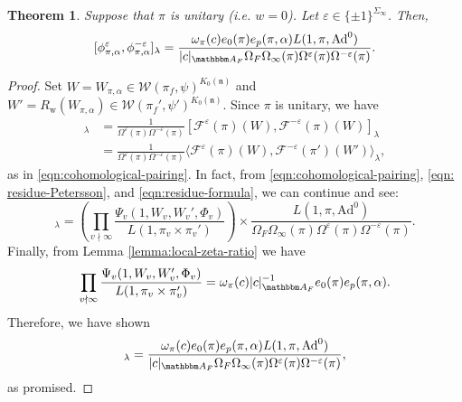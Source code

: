 \documentclass[10pt, twoside]{amsart}
\theoremstyle{plain}
\newtheorem{theorem}{Theorem}
\theoremstyle{definition}
\theoremstyle{remark}
\numberwithin{equation}{subsection}
\def\A{\mathbbm A}
\def\Ad{\mathrm{Ad}}
\def\gn{\mathfrak n}
\def\calw{\mathcal W}
\def\calf{\mathcal F}
\begin{document}
\begin{theorem}\label{thm:adjointLvalues}
Suppose that $\pi$ is unitary (i.e. $w = 0$). Let $\varepsilon \in \{\pm 1\}^{\Sigma_\infty}$. Then,
\begin{equation}\label{eq-adjoint}
[ \phi^{\varepsilon}_{\pi, \alpha}, \phi^{-\varepsilon}_{\pi, \alpha} ]_\lambda =  \frac{\omega_{\pi}(c)e_0(\pi)e_p(\pi,\alpha)L(1,\pi,\mathrm{Ad}^0)}{|c|_{\A_F}\Omega_F \Omega_\infty(\pi) \Omega^{\varepsilon}(\pi)\Omega^{-\varepsilon}(\pi)}.
\end{equation}
\end{theorem}
\begin{proof}
Set $W = W_{\pi,\alpha} \in \calw(\pi_f,\psi)^{K_0(\gn)}$ and $W' = R_{{ \boldsymbol{\mathrm{w}}}}(W_{\pi,\alpha}) \in \calw(\pi_f',\psi')^{K_0(\gn)}$. Since $\pi$ is unitary, we have
\begin{align*}
[\phi_{\pi,\alpha}^{\varepsilon}, \phi_{\pi,\alpha}^{-\varepsilon}]_{\lambda} &= \frac{1}{\Omega^{\varepsilon}(\pi)\Omega^{-\varepsilon}(\pi)}[\calf^{\varepsilon}(\pi)(W),\calf^{-\varepsilon}(\pi)(W)]_{\lambda}\\
&= \frac{1}{\Omega^{\varepsilon}(\pi)\Omega^{-\varepsilon}(\pi)} \langle \calf^{\varepsilon}(\pi)(W),\calf^{-\varepsilon}(\pi')(W')\rangle_{\lambda},
\end{align*}
as in \eqref{eqn:cohomological-pairing}. In fact, from \eqref{eqn:cohomological-pairing}, \eqref{eqn: residue-Petersson}, and \eqref{eqn:residue-formula}, we can continue and see:
\begin{equation*}
[ \phi^{\varepsilon}_{\pi, \alpha}, \phi^{-\varepsilon}_{\pi, \alpha} ]_\lambda = \left(\prod_{v \nmid \infty} \frac{\Psi_v(1,W_v,W_v',\Phi_v)}{L(1,\pi_v\times \pi_v')}\right) \times \frac{L(1,\pi,\Ad^0)}{\Omega_F \Omega_{\infty}(\pi) \Omega^{\varepsilon}(\pi) \Omega^{-\varepsilon}(\pi)}.
\end{equation*}
Finally, from Lemma \ref{lemma:local-zeta-ratio} we have
\begin{equation*}
\prod_{v \nmid \infty} \frac{\Psi_v(1,W_v,W_v',\Phi_v)}{L(1,\pi_v\times \pi_v')} = \omega_{\pi}(c)|c|^{-1}_{\A_F} e_0(\pi)e_p(\pi,\alpha).
\end{equation*}
Therefore, we have shown
\begin{equation*}
[ \phi^{\varepsilon}_{\pi, \alpha}, \phi^{-\varepsilon}_{\pi, \alpha} ]_\lambda =  \frac{\omega_{\pi}(c)e_0(\pi)e_p(\pi,\alpha)L(1,\pi,\mathrm{Ad}^0)}{|c|_{\A_F}\Omega_F \Omega_\infty(\pi) \Omega^{\varepsilon}(\pi)\Omega^{-\varepsilon}(\pi)},
\end{equation*}
as promised.
\end{proof}
\end{document}
